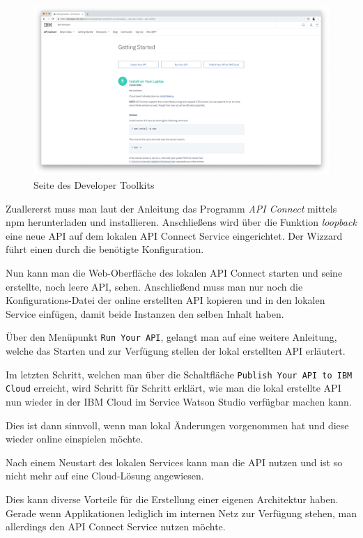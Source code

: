 \begin{figure}[h]
    \centering
    \includegraphics[width=\textwidth]{images/kapitel_3/developer_toolkit.png}
    \caption{Seite des Developer Toolkits}
    \label{fig:umsetzung_developer_toolkit}
\end{figure}

Zuallererst muss man laut der Anleitung das Programm \textit{API Connect} mittels npm herunterladen und installieren.
Anschließens wird über die Funktion \textit{loopback} eine neue API auf dem lokalen API Connect Service eingerichtet.
Der Wizzard führt einen durch die benötigte Konfiguration.

Nun kann man die Web-Oberfläche des lokalen API Connect starten und seine erstellte, noch leere API, sehen. Anschließend
muss man nur noch die Konfigurations-Datei der online erstellten API kopieren und in den lokalen Service einfügen, damit
beide Instanzen den selben Inhalt haben.

Über den Menüpunkt \texttt{Run Your API}, gelangt man auf eine weitere Anleitung, welche das Starten und zur Verfügung
stellen der lokal erstellten API erläutert.

Im letzten Schritt, welchen man über die Schaltfläche \texttt{Publish Your API to IBM Cloud} erreicht, wird Schritt für
Schritt erklärt, wie man die lokal erstellte API nun wieder in der IBM Cloud im Service Watson Studio verfügbar machen
kann.

Dies ist dann sinnvoll, wenn man lokal Änderungen vorgenommen hat und diese wieder online einspielen möchte.

Nach einem Neustart des lokalen Services kann man die API nutzen und ist so nicht mehr auf eine Cloud-Lösung angewiesen.

Dies kann diverse Vorteile für die Erstellung einer eigenen Architektur haben. Gerade wenn Applikationen lediglich im
internen Netz zur Verfügung stehen, man allerdings den API Connect Service nutzen möchte.

